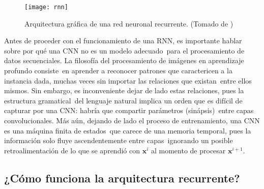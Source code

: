 \begin{figure}
  \centering
  \texttt{[image: rnn]}
  \caption{Arquitectura gráfica de una red neuronal recurrente.
    (Tomado de \cite{goodfellow-et-al-2016})}
  \label{recurrent_fig}
\end{figure}

Antes de proceder con el funcionamiento de una RNN, es importante hablar sobre por qué una CNN no es un modelo adecuado\
para el procesamiento de datos secuenciales. La filosofía del procesamiento de imágenes en aprendizaje profundo consiste\
en aprender a reconocer patrones que caractericen a la instancia dada, muchas veces sin importar las relaciones que existan\
entre ellos mismos. Sin embargo, es inconveniente dejar de lado estas relaciones, pues la estructura gramatical\
del lenguaje natural implica un orden que es difícil de capturar por una CNN: habría que compartir parámetros (sinápsis)\
entre capas convolucionales. Más aún, dejando de lado el proceso de entrenamiento, una CNN es una máquina finita de estados\
que carece de una memoria temporal, pues la información solo fluye ascendentemente entre capas\
ignorando un posible retroalimentación de lo que se aprendió con $\mathbf{x}^i$ al momento de procesar $\mathbf{x}^{i+1}$.

\subsection{¿Cómo funciona la arquitectura recurrente?}

